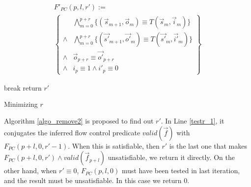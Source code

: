\documentclass[conference]{IEEEtran}
\begin{document}



\begin{multline}\label{uniqt11}
F'_{PC}(p,l,r'):=\\
\left\{
\begin{array}{cc}
&\bigwedge_{m=0}^{p+r}
\{
(\vec{s}_{m+1},\vec{o}_m)\equiv T(\vec{s}_m,\vec{i}_m)
\}
\\
\wedge&\bigwedge_{m=0}^{p+r}
\{
(\vec{s'}_{m+1},\vec{o'}_m)\equiv T(\vec{s'}_m,\vec{i'}_m)
\}
\\
\wedge&\vec{o}_{p+r}\equiv \vec{o'}_{p+r} \\
\wedge& i_{p}\equiv 1 \wedge  i'_{p}\equiv 0 
\end{array}
\right\}
\end{multline}


\begin{algorithm}[t]
\SetAlgoVlined
{} {
   {
    break
  }
}
return $r'$
\caption{Minimizing $r$}
\label{algo_remove2}
\end{algorithm}

Algorithm \ref{algo_remove2} is proposed to find out $r'$.
In Line \ref{testr_1},
it conjugates the inferred flow control predicate $valid(\vec{f})$  with $F_{PC}(p+l,0,r'-1)$.
When this is satisfiable,
then $r'$ is the last one that makes $F_{PC}(p+l,0,r')\wedge valid(\vec{f}_{p+l})$ unsatisfiable,
we return it directly.
On the other hand,
when $r'\equiv 0$,
$F_{PC}(p,l,0)$ must have been tested in last iteration,
and the result must be unsatisfiable.
In this case we return $0$.
\end{document}
